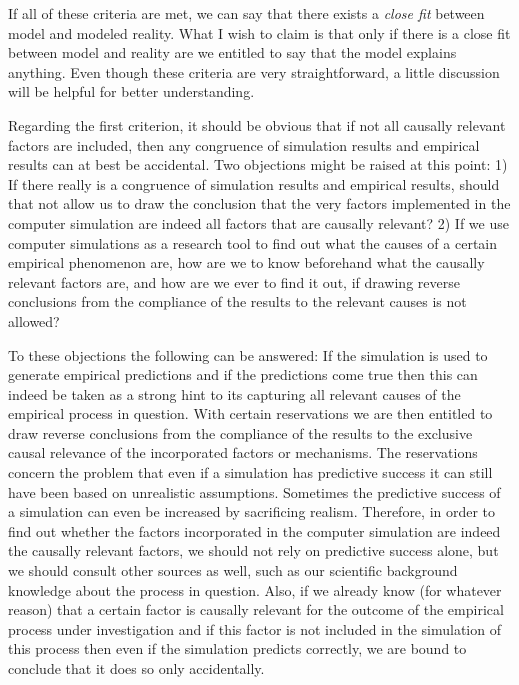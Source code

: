 If all of these criteria are met, we can say that there exists a {\em close
  fit} between model and modeled reality. What I wish to claim is that only if
there is a close fit between model and reality are we entitled to say that the
model explains anything. Even though these criteria are very straightforward,
a little discussion will be helpful for better understanding.

Regarding the first criterion, it should be obvious that if not all causally
relevant factors are included, then any congruence of simulation results and
empirical results can at best be accidental. Two objections might be raised at
this point: 1) If there really is a congruence of simulation results and
empirical results, should that not allow us to draw the conclusion that the
very factors implemented in the computer simulation are indeed all factors
that are causally relevant?  2) If we use computer simulations as a research
tool to find out what the causes of a certain empirical phenomenon are, how
are we to know beforehand what the causally relevant factors are, and how are
we ever to find it out, if drawing reverse conclusions from the compliance of
the results to the relevant causes is not allowed?

To these objections the following can be answered: If the simulation is used
to generate empirical predictions and if the predictions come true then this
can indeed be taken as a strong hint to its capturing all relevant causes of the
empirical process in question. With certain reservations we are then entitled
to draw reverse conclusions from the compliance of the results to the
exclusive causal relevance of the incorporated factors or mechanisms. The
reservations concern the problem that even if a simulation has predictive
success it can still have been based on unrealistic assumptions. Sometimes the
predictive success of a simulation can even be increased by sacrificing
realism.  Therefore, in order to find out whether the factors incorporated in
the computer simulation are indeed the causally relevant factors, we should
not rely on predictive success alone, but we should consult other sources as
well, such as our scientific background knowledge about the process in
question. Also, if we already know (for whatever reason) that a certain factor
is causally relevant for the outcome of the empirical process under
investigation and if this factor is not included in the simulation of this
process then even if the simulation predicts correctly, we are bound to
conclude that it does so only accidentally.

